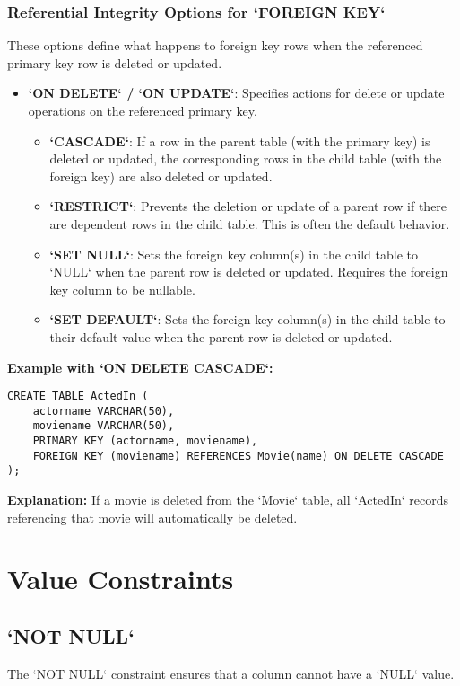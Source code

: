 \documentclass{article}
\begin{document}
\subsubsection*{Referential Integrity Options for `FOREIGN KEY`} 
These options define what happens to foreign key rows when the referenced primary key row is deleted or updated.
\begin{itemize}
    \item \textbf{`ON DELETE` / `ON UPDATE`}: Specifies actions for delete or update operations on the referenced primary key.
        \begin{itemize}
            \item \textbf{`CASCADE`}: If a row in the parent table (with the primary key) is deleted or updated, the corresponding rows in the child table (with the foreign key) are also deleted or updated. 
            \item \textbf{`RESTRICT`}: Prevents the deletion or update of a parent row if there are dependent rows in the child table. This is often the default behavior. 
            \item \textbf{`SET NULL`}: Sets the foreign key column(s) in the child table to `NULL` when the parent row is deleted or updated. Requires the foreign key column to be nullable. 
            \item \textbf{`SET DEFAULT`}: Sets the foreign key column(s) in the child table to their default value when the parent row is deleted or updated. 
        \end{itemize}
\end{itemize}

\textbf{Example with `ON DELETE CASCADE`:} 
\begin{lstlisting}
CREATE TABLE ActedIn (
    actorname VARCHAR(50),
    moviename VARCHAR(50),
    PRIMARY KEY (actorname, moviename),
    FOREIGN KEY (moviename) REFERENCES Movie(name) ON DELETE CASCADE
);
\end{lstlisting}
\textbf{Explanation:} If a movie is deleted from the `Movie` table, all `ActedIn` records referencing that movie will automatically be deleted.

\section*{Value Constraints}

\subsection*{`NOT NULL`}
The `NOT NULL` constraint ensures that a column cannot have a `NULL` value.
\end{document}
